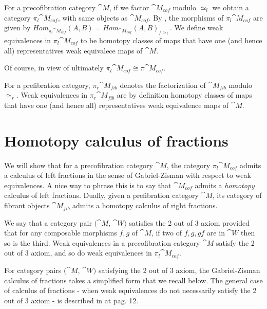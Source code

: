 For a precofibration category ${\cat M}$, if we factor ${\cat M}_{cof}$ modulo $\simeq_l$ we obtain a category $\pi_l {\cat M}_{cof}$, with same objects as ${\cat M}_{cof}$. By , the morphisms of $\pi_l {\cat M}_{cof}$ are given by $Hom_{\pi_l {\cat M}_{cof}}(A,B) = Hom_{{\cat M}_{cof}}(A,B)_{/ \simeq_l}$. We define weak equivalences in $\pi_l {\cat M}_{cof}$ to be homotopy classes of maps that have one (and hence all) representatives weak equivalece maps of ${\cat M}$.

Of course, in view of  ultimately $\pi_l {\cat M}_{cof} \cong \pi {\cat M}_{cof}$. 

For a prefibration category, $\pi_r {\cat M}_{fib}$ denotes the factorization of ${\cat M}_{fib}$ modulo $\simeq_r$. Weak equivalences in $\pi_r {\cat M}_{fib}$ are by definition homotopy classes of maps that have one (and hence all) representatives weak equivalence maps of ${\cat M}$.


\section{Homotopy calculus of fractions}
\label{chap:homotopycalcoffractions}

We will show that for a precofibration category ${\cat M}$, the category $\pi_l {\cat M}_{cof}$ admits a calculus of left fractions in the sense of Gabriel-Zisman with respect to weak equivalences. A nice way to phrase this is to say that ${\cat M}_{cof}$ admits a {\it homotopy} calculus of left fractions. Dually, given a prefibration category ${\cat M}$, its category of fibrant objects ${\cat M}_{fib}$ admits a homotopy calculus of right fractions.

We say that a category pair $({\cat M}$, ${\cat W})$ satisfies the 2 out of 3 axiom provided that for any composable morphisms $f, g$ of ${\cat M}$, if two of $f, g, gf$ are in ${\cat W}$ then so is the third. Weak equivalences in a precofibration category ${\cat M}$ satisfy the 2 out of 3 axiom, and so do weak equivalences in $\pi_l {\cat M}_{cof}$. 

For category pairs $({\cat M}$, ${\cat W})$ satisfying the 2 out of 3 axiom, the Gabriel-Zisman calculus of fractions takes a simplified form that we recall below. The general case of calculus of fractions - when weak equivalences do not necessarily satisfy the 2 out of 3 axiom - is described in \cite{Gabriel-Zisman} at pag. 12.

